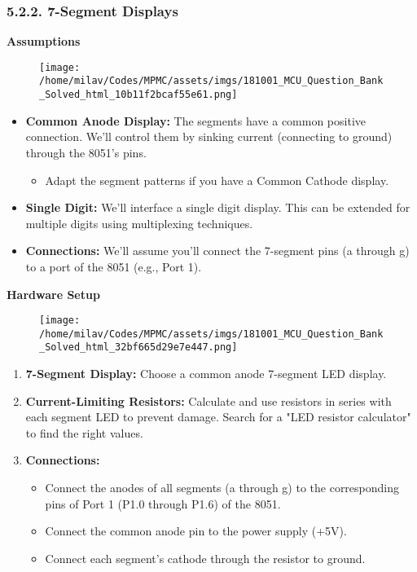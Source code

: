 \documentclass[
]{article}
\begin{document}
\hypertarget{522-7-segment-displays}{%
\subsubsection{5.2.2. 7-Segment Displays}\label{522-7-segment-displays}}

\textbf{Assumptions}

\begin{figure}
\centering
\texttt{[image: /home/milav/Codes/MPMC/assets/imgs/181001\_MCU\_Question\_Bank\_Solved\_html\_10b11f2bcaf55e61.png]}
\caption{}
\end{figure}

\begin{itemize}
\item
  \textbf{Common Anode Display:} The segments have a common positive
  connection. We'll control them by sinking current (connecting to
  ground) through the 8051's pins.

  \begin{itemize}
  \item
    Adapt the segment patterns if you have a Common Cathode display.
  \end{itemize}
\item
  \textbf{Single Digit:} We'll interface a single digit display. This
  can be extended for multiple digits using multiplexing techniques.
\item
  \textbf{Connections:} We'll assume you'll connect the 7-segment pins
  (a through g) to a port of the 8051 (e.g., Port 1).
\end{itemize}

\textbf{Hardware Setup}

\begin{figure}
\centering
\texttt{[image: /home/milav/Codes/MPMC/assets/imgs/181001\_MCU\_Question\_Bank\_Solved\_html\_32bf665d29e7e447.png]}
\caption{}
\end{figure}

\begin{enumerate}
\def\labelenumi{\arabic{enumi}.}
\item
  \textbf{7-Segment Display:} Choose a common anode 7-segment LED
  display.
\item
  \textbf{Current-Limiting Resistors:} Calculate and use resistors in
  series with each segment LED to prevent damage. Search for a "LED
  resistor calculator" to find the right values.
\item
  \textbf{Connections:}

  \begin{itemize}
  \item
    Connect the anodes of all segments (a through g) to the
    corresponding pins of Port 1 (P1.0 through P1.6) of the 8051.
  \item
    Connect the common anode pin to the power supply (+5V).
  \item
    Connect each segment's cathode through the resistor to ground.
  \end{itemize}
\end{enumerate}
\end{document}
